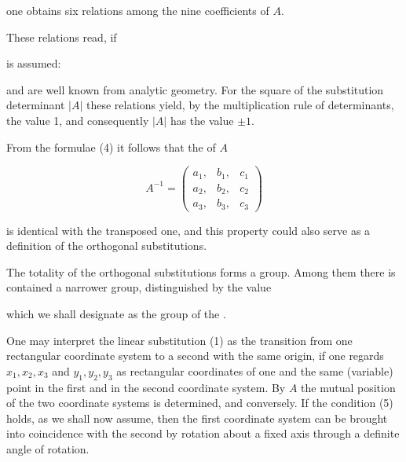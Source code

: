 one obtains six relations among the nine coefficients
of $A$.

These relations read, if


is assumed:


and are well known from analytic geometry. For the square
of the substitution determinant $|A|$ these relations yield, by
the multiplication rule of determinants, the value 1, and consequently
$|A|$ has the value $\pm 1$.

From the formulae (4) it follows that the  of $A$

\[
A^{-1} = \begin{pmatrix} a_1, & b_1, & c_1\\ a_2, & b_2, & c_2\\ a_3, & b_3, & c_3 \end{pmatrix}
\]

is identical with the transposed one, and this property could
also serve as a definition of the orthogonal substitutions.

The totality of the orthogonal substitutions forms
a group. Among them there is contained a narrower group,
distinguished by the value


which we shall designate as the group of the .

One may interpret the linear substitution (1) as the transition
from one rectangular coordinate system to a second
with the same origin, if one regards $x_1, x_2, x_3$ and
$y_1, y_2, y_3$ as rectangular coordinates of one and the same
(variable) point in the first and in the second coordinate system. By $A$ the mutual position of the
two coordinate systems is determined, and conversely. If
the condition (5) holds, as we shall now assume, then
the first coordinate system can be brought into coincidence with the second by rotation about a fixed axis through a
definite angle of rotation.
